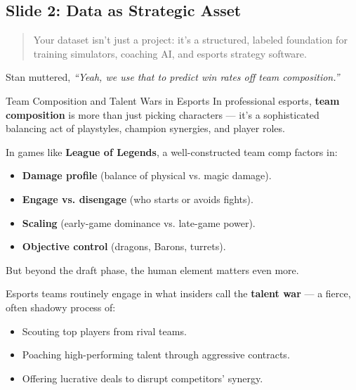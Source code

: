 \subsection{Slide 2: Data as Strategic Asset} 

\begin{quote}
Your dataset isn’t just a project: it’s a structured, labeled foundation for training simulators, coaching AI, and esports strategy software.
\end{quote}
    
    Stan muttered, \textit{``Yeah, we use that to predict win rates off team composition.''}

    \medskip

    \begin{HistoricalSidebar}{Team Composition and Talent Wars in Esports}
        In professional esports, \textbf{team composition} is more than just picking characters — it’s a sophisticated balancing act of playstyles, champion synergies, and player roles.

        \medskip
        
        In games like \textbf{League of Legends}, a well-constructed team comp factors in:

        \medskip

        \begin{itemize}
            \item \textbf{Damage profile} (balance of physical vs. magic damage).
            \item \textbf{Engage vs. disengage} (who starts or avoids fights).
            \item \textbf{Scaling} (early-game dominance vs. late-game power).
            \item \textbf{Objective control} (dragons, Barons, turrets).
        \end{itemize}

        \medskip
        
        But beyond the draft phase, the human element matters even more.
        
        \medskip
        
        Esports teams routinely engage in what insiders call the \textbf{talent war} — a fierce, often shadowy process of:

        \medskip

        \begin{itemize}
            \item Scouting top players from rival teams.
            \item Poaching high-performing talent through aggressive contracts.
            \item Offering lucrative deals to disrupt competitors’ synergy.
        \end{itemize}


\end{HistoricalSidebar}
